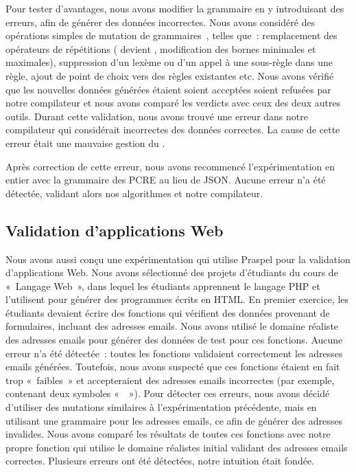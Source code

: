 Pour tester d'avantages, nous avons modifier la grammaire en y introduisant des
erreurs, afin de générer des données incorrectes. Nous avons considéré des
opérations simples de mutation de grammaires~, telles que~:
remplacement des opérateurs de répétitions (\code{+} devient \code{*},
modification des bornes minimales et maximales), suppression d'un lexème ou d'un
appel à une sous-règle dans une règle, ajout de point de choix vers des règles
existantes etc. Nous avons vérifié que les nouvelles données générées étaient
soient acceptées soient refusées par notre compilateur et nous avons comparé les
verdicts avec ceux des deux autres outils. Durant cette validation, nous avons
trouvé une erreur dans notre compilateur qui considérait incorrectes des données
correctes. La cause de cette erreur était une mauvaise gestion du
.

Après correction de cette erreur, nous avons recommencé l'expérimentation en
entier avec la grammaire des PCRE au lieu de JSON. Aucune erreur n'a été
détectée, validant alors nos algorithmes et notre compilateur.

\subsection{Validation d'applications Web}

Nous avons aussi conçu une expérimentation qui utilise Praspel pour la
validation d'applications Web. Nous avons sélectionné des projets d'étudiants du
cours de «~Langage Web~», dans lequel les étudiants apprennent le langage PHP et
l'utilisent pour générer des programmes écrits en HTML. En premier exercice, les
étudiants devaient écrire des fonctions qui vérifient des données provenant de
formulaires, incluant des adresses emails. Nous avons utilisé le domaine
réaliste des adresses emails pour générer des données de test pour ces
fonctions. Aucune erreur n'a été détectée~: toutes les fonctions validaient
correctement les adresses emails générées. Toutefois, nous avons suspecté que
ces fonctions étaient en fait trop «~faibles~» et accepteraient des adresses
emails incorrectes (par exemple, contenant deux symboles «~~»). Pour
détecter ces erreurs, nous avons décidé d'utiliser des mutations similaires à
l'expérimentation précédente, mais en utilisant une grammaire pour les adresses
emails, ce afin de générer des adresses invalides. Nous avons comparé les
résultats de toutes ces fonctions avec notre propre fonction qui utilise le
domaine réalistes initial validant des adresses emails correctes. Plusieurs
erreurs ont été détectées, notre intuition était fondée.

